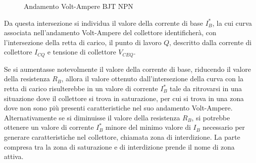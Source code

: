 \documentclass{article}
\numberwithin{equation}{subsection}
\begin{document}
\begin{figure}[H]%
    \centering
    \qquad
    \caption{Andamento Volt-Ampere BJT NPN}
    \label{fig:andamento-volt-ampere-npn}
\end{figure}
Da questa intersezione si individua il valore della corrente di base $I_B^*$, la cui curva associata nell'andamento Volt-Ampere del collettore 
identificherà, con l'intersezione della retta di carico, il punto di lavoro $Q$, descritto dalla corrente di collettore $I_{CQ}$ e tensione di 
collettore $V_{CEQ}$. 

Se si aumentasse notevolmente il valore della corrente di base, riducendo il valore della resistenza $R_B$, allora il valore ottenuto dall'intersezione della curva con la 
retta di carico risulterebbe in un valore di corrente $I_B^*$ tale da ritrovarsi in una situazione dove il collettore si trova in saturazione, per cui si trova in 
una zona dove non sono più presenti caratteristiche nel suo andamento Volt-Ampere. 
Alternativamente se si diminuisse il valore della resistenza $R_B$, si potrebbe ottenere un valore di corrente $I_B^*$ minore del minimo valore di $I_B$ necessario per generare 
caratteristiche nel collettore, chiamata zona di interdizione. 
La parte compresa tra la zona di saturazione e di interdizione prende il nome di zona attiva.    
\end{document}
